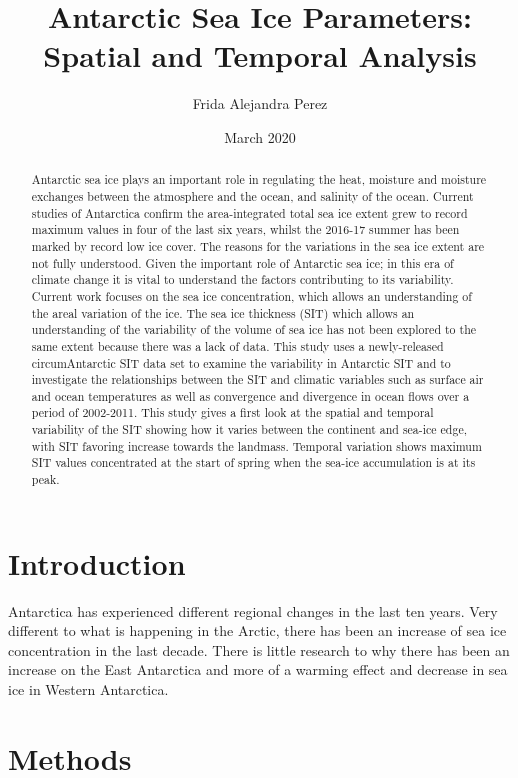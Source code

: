 \documentclass{article}
\title{Antarctic Sea Ice Parameters: Spatial and Temporal Analysis}
\author{Frida Alejandra Perez}
\date{March 2020}
\begin{document}
\maketitle

\begin{abstract}
Antarctic sea ice plays an important role in regulating the heat, moisture and moisture exchanges between the atmosphere and the ocean, and salinity of the ocean. Current studies of Antarctica confirm the area-integrated total sea ice extent grew to record maximum values in four of the last six years, whilst the 2016-17 summer has been marked by record low ice cover. The reasons for the variations in the sea ice extent are not fully understood. Given the important role of Antarctic sea ice; in this era of climate change it is vital to understand the factors contributing to its variability. Current work focuses on the sea ice concentration, which allows an understanding of the areal variation of the ice. The sea ice thickness (SIT) which allows an understanding of the variability of the volume of sea ice has not been explored to the same extent because there was a lack of data. This study uses a newly-released circumAntarctic SIT data set to examine the variability in Antarctic SIT and to investigate the relationships between the SIT and climatic variables such as surface air and ocean temperatures as well as convergence and divergence in ocean flows over a period of 2002-2011. This study gives a first look at the spatial and temporal variability of the SIT showing how it varies between the continent and sea-ice edge, with SIT favoring increase towards the landmass. Temporal variation shows maximum SIT values concentrated at the start of spring when the sea-ice accumulation is at its peak.
\end{abstract}


\section{Introduction}
Antarctica has experienced different regional changes in the last ten years. Very different to what is happening in the Arctic, there has been an increase of sea ice concentration in the last decade. There is little research to why there has been an increase on the East Antarctica and more of a warming effect and decrease in sea ice in Western Antarctica. 

 
\section{Methods}
\end{document}
